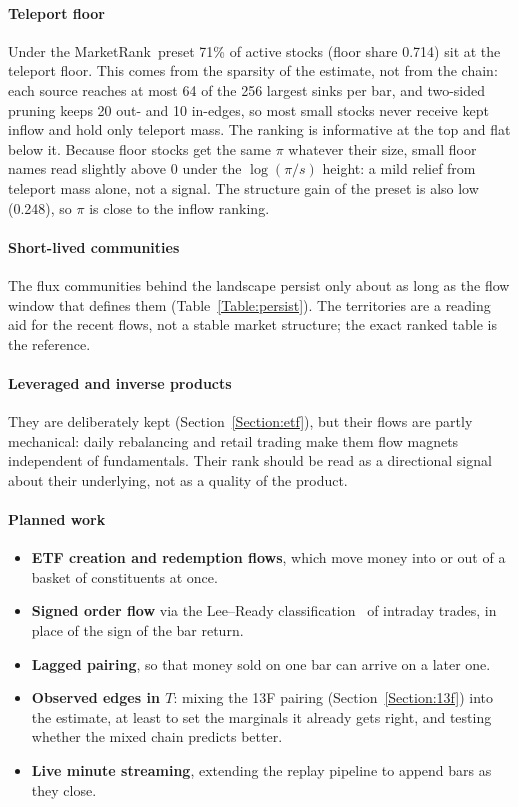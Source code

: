 \documentclass[preprint,3p,twocolumn]{elsarticle}
\newcommand{\MR}{MarketRank}
\begin{document}
\paragraph{Teleport floor} Under the \MR\ preset 71\% of active stocks (floor share 0.714) sit at the teleport floor. This comes from the sparsity of the estimate, not from the chain: each source reaches at most 64 of the 256 largest sinks per bar, and two-sided pruning keeps 20 out- and 10 in-edges, so most small stocks never receive kept inflow and hold only teleport mass. The ranking is informative at the top and flat below it. Because floor stocks get the same $\pi$ whatever their size, small floor names read slightly above 0 under the $\log(\pi/s)$ height: a mild relief from teleport mass alone, not a signal. The structure gain of the preset is also low (0.248), so $\pi$ is close to the inflow ranking.

\paragraph{Short-lived communities} The flux communities behind the landscape persist only about as long as the flow window that defines them (Table~\ref{Table:persist}). The territories are a reading aid for the recent flows, not a stable market structure; the exact ranked table is the reference.

\paragraph{Leveraged and inverse products} They are deliberately kept (Section~\ref{Section:etf}), but their flows are partly mechanical: daily rebalancing and retail trading make them flow magnets independent of fundamentals. Their rank should be read as a directional signal about their underlying, not as a quality of the product.

\paragraph{Planned work}
\begin{itemize}
\item \textbf{ETF creation and redemption flows}, which move money into or out of a basket of constituents at once.
\item \textbf{Signed order flow} via the Lee--Ready classification~\cite{leeready} of intraday trades, in place of the sign of the bar return.
\item \textbf{Lagged pairing}, so that money sold on one bar can arrive on a later one.
\item \textbf{Observed edges in $T$}: mixing the 13F pairing (Section~\ref{Section:13f}) into the estimate, at least to set the marginals it already gets right, and testing whether the mixed chain predicts better.
\item \textbf{Live minute streaming}, extending the replay pipeline to append bars as they close.
\end{itemize}
\end{document}

